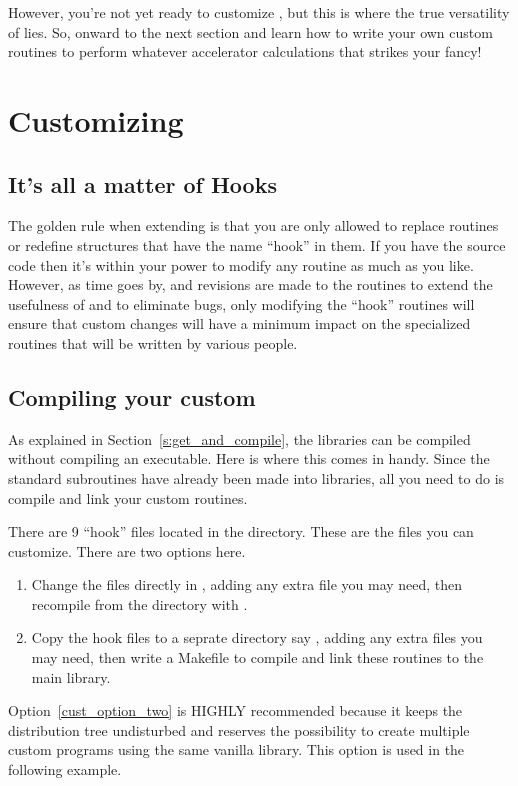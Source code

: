 However, you're not yet ready to customize \tao, but this is where the true versatility
of \tao lies. So, onward to the next section and learn how to write your
own custom routines to perform whatever accelerator calculations that strikes your
fancy!

\chapter{Customizing \tao}
\label{c:custom_tao}

\section{It's all a matter of Hooks}

The golden rule when extending \tao is that you are only allowed to replace
routines or redefine structures that have the name ``hook'' in them. 
If you have the source code then it's within your power to modify any routine as much 
as you like. However, as time
goes by, and revisions are made to the \tao routines to extend the
usefulness of \tao and to eliminate bugs, only modifying the ``hook'' routines
will ensure that custom changes will
have a minimum impact on the specialized routines that will be written
by various people. 

\section{Compiling your custom \tao}

As explained in Section~\ref{s:get_and_compile}, the \tao libraries can be
compiled without compiling an executable. Here is where this comes in handy. Since
the standard \tao subroutines have already been made into libraries, all you
need to do is compile and link your custom routines.

There are 9 ``hook'' files located in the  directory. These are
the files you can customize. There are two options here. 
\begin{enumerate}
  \item Change the files directly in , adding any extra file you
may need, then recompile from the  directory with .
\label{cust_optiin_one}
  \item Copy the hook files to a seprate directory say ,
adding any extra files you may need, then write a Makefile to compile and link these
routines to the main \tao library.
\label{cust_option_two}
\end{enumerate}
Option~\ref{cust_option_two} is HIGHLY recommended because it keeps the \tao
distribution tree undisturbed and reserves the possibility to create multiple
custom \tao programs using the same vanilla \tao library. This option is used in
the following example.

